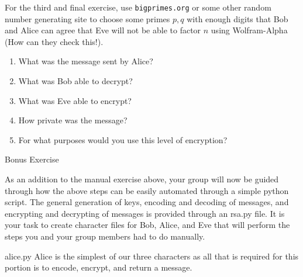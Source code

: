 \documentclass{article}
\begin{document}
    For the third and final exercise, use \verb|bigprimes.org| or some other random number generating site to choose some primes $p,q$ with enough digits that Bob and Alice can agree that Eve will not be able to factor $n$ using Wolfram-Alpha (How can they check this!). 

    \begin{enumerate}
        \item What was the message sent by Alice? 

            \TextField[width=6in,height=1in]{}

        \item What was Bob able to decrypt?

            \TextField[width=6in,height=1in]{}

        \item What was Eve able to encrypt?

            \TextField[width=6in,height=1in]{}

        \item How private was the message?

            \TextField[width=6in,height=1in]{}

        \item For what purposes would you use this level of encryption?

            \TextField[width=6in,height=1in]{}

    \end{enumerate}

    \newpage
    \huge Bonus Exercise
    \normalsize

    As an addition to the manual exercise above, your group will now be guided through how the above steps can be easily automated through a simple python script.
    The general generation of keys, encoding and decoding of messages, and encrypting and decrypting of messages is provided through an rsa.py file. It is your task to create character files for Bob, Alice, and Eve that will perform the steps you and your group members had to do manually.

    alice.py
    Alice is the simplest of our three characters as all that is required for this portion is to encode, encrypt, and return a message.
\end{document}
